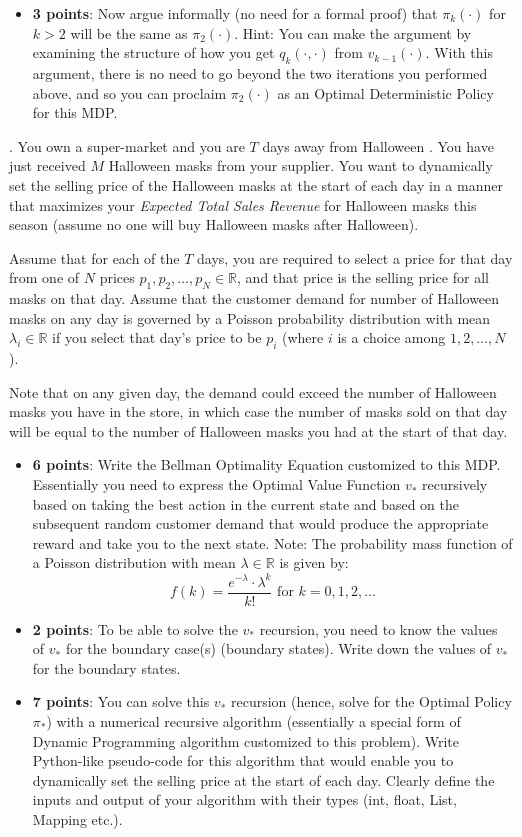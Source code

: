 \documentclass[12pt]{exam}
\begin{document}
\begin{questions}
\begin{itemize}
\item {\bf 3 points}: Now argue informally (no need for a formal proof) that $\pi_k(\cdot)$ for $k > 2$ will be the same as $\pi_2(\cdot)$. Hint: You can make the argument by examining the structure of how you get $q_k(\cdot, \cdot)$ from $v_{k-1}(\cdot)$. With this argument, there is no need to go beyond the two iterations you performed above, and so you can proclaim $\pi_2(\cdot)$ as an Optimal Deterministic Policy for this MDP.
\end{itemize}
\pagebreak
{}. You own a super-market and you are $T$ days away from Halloween \smiley . You have just received $M$ Halloween masks from your supplier. You want to dynamically set the selling price of the Halloween masks at the start of each day in a manner that maximizes your {\em Expected Total Sales Revenue} for Halloween masks this season (assume no one will buy Halloween masks after Halloween). 

Assume that for each of the $T$ days, you are required to select a price for that day from one of $N$ prices $p_1, p_2, \ldots, p_N \in \mathbb{R}$, and that price is the selling price for all masks on that day.  Assume that the customer demand for number of Halloween masks on any day is governed by a Poisson probability distribution with mean $\lambda_i \in \mathbb{R}$ if you select that day's price to be $p_i$ (where $i$ is a choice among $1, 2, \ldots, N$). 

Note that on any given day, the demand could exceed the number of Halloween masks you have in the store, in which case the number of masks sold on that day will be equal to the number of Halloween masks you had at the start of that day.

 \begin{itemize}
\item {\bf 6 points}: Write the Bellman Optimality Equation customized to this MDP. Essentially you need to express the Optimal Value Function $v_*$ recursively based on taking the best action in the current state and based on the subsequent random customer demand that would produce the appropriate reward and take you to the next state. Note: The probability mass function of a Poisson distribution with mean $\lambda \in \mathbb{R}$ is given by:
 $$f(k) = \frac {e^{-\lambda} \cdot \lambda^k} {k!} \mbox{ for } k = 0, 1, 2, \ldots$$
 \item {\bf 2 points}: To be able to solve the $v_*$ recursion, you need to know the values of $v_*$ for the boundary case(s) (boundary states). Write down the values of $v_*$ for the boundary states.
\item {\bf 7 points}: You can solve this $v_*$ recursion (hence, solve for the Optimal Policy $\pi_*$) with a numerical recursive algorithm (essentially a special form of Dynamic Programming algorithm customized to this problem). Write Python-like pseudo-code for this algorithm that would enable you to dynamically set the selling price at the start of each day. Clearly define the inputs and output of your algorithm with their types (int, float, List, Mapping etc.).
\end{itemize} 
 
\end{questions}
\end{document}
